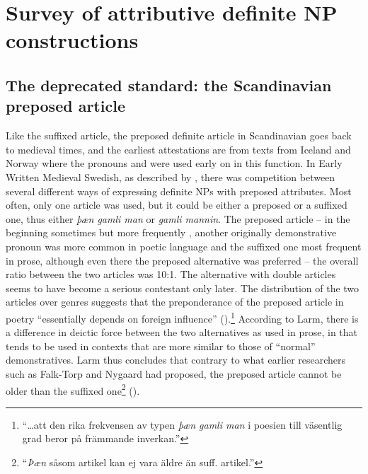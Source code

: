 \section{Survey of attributive definite NP constructions}
\label{bkm:Ref224464037}\subsection{The deprecated standard: the Scandinavian preposed article}
\label{bkm:Ref154983973}\label{bkm:Ref154988501}
Like the suffixed article, the preposed definite article in Scandinavian goes back to medieval times, and the earliest attestations are from texts from Iceland and Norway where the pronouns and were used early on in this function. In Early Written Medieval Swedish, as described by \citet{Larm1936}, there was competition between several different ways of expressing definite NPs with preposed attributes. Most often, only one article was used, but it could be either a preposed or a suffixed one, thus either \textit{þæn gamli man} or \textit{gamli mannin}. The preposed article – in the beginning sometimes  but more frequently , another originally demonstrative pronoun was more common in poetic language and the suffixed one most frequent in prose, although even there the preposed alternative was preferred – the overall ratio between the two articles was 10:1. The alternative with double articles seems to have become a serious contestant only later. The distribution of the two articles over genres suggests that the preponderance of the preposed article in poetry “essentially depends on foreign influence” (\citet[68]{Larm1936}).\footnote{ “…att den rika frekvensen av typen \textit{þæn gamli man} i poesien till väsentlig grad beror på främmande inverkan.”} According to Larm, there is a difference in deictic force between the two alternatives as used in prose, in that  tends to be used in contexts that are more similar to those of “normal” demonstratives. Larm thus concludes that contrary to what earlier researchers such as Falk-Torp and Nygaard had proposed, the preposed article  cannot be older than the suffixed one\footnote{ “\textit{Þæn }såsom artikel kan ej vara äldre än suff. artikel.” } (\citet[64]{Larm1936}).


